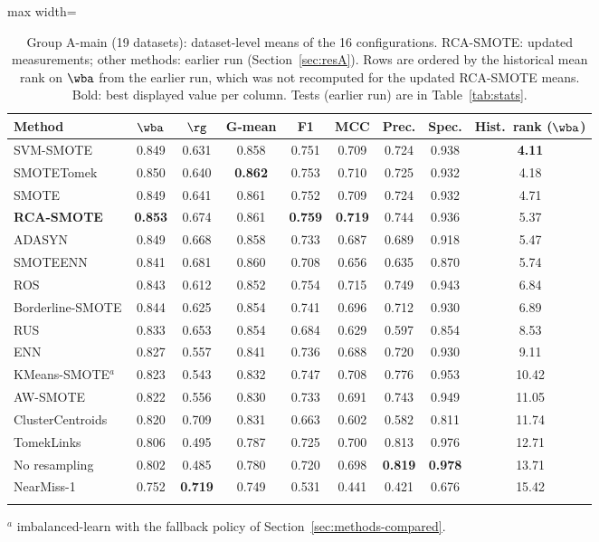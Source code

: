 \begin{table}[!htb]
\caption{Group A-main (19 datasets): dataset-level means of the 16 configurations. RCA-SMOTE: updated measurements; other methods: earlier run (Section~\ref{sec:resA}). Rows are ordered by the historical mean rank on $\wba$ from the earlier run, which was not recomputed for the updated RCA-SMOTE means. Bold: best displayed value per column. Tests (earlier run) are in Table~\ref{tab:stats}.}\label{tab:groupA}
\centering\tabfont
\setlength{\tabcolsep}{4.2pt}
\begin{adjustbox}{max width=\textwidth}
\begin{tabular}{@{}lcccccccc@{}}
\toprule
Method & $\wba$ & $\rg$ & G-mean & F1 & MCC & Prec. & Spec. & Hist.\ rank ($\wba$) \\
\midrule
SVM-SMOTE & 0.849 & 0.631 & 0.858 & 0.751 & 0.709 & 0.724 & 0.938 & \textbf{4.11} \\
SMOTETomek & 0.850 & 0.640 & \textbf{0.862} & 0.753 & 0.710 & 0.725 & 0.932 & 4.18 \\
SMOTE & 0.849 & 0.641 & 0.861 & 0.752 & 0.709 & 0.724 & 0.932 & 4.71 \\
\textbf{RCA-SMOTE} & \textbf{0.853} & 0.674 & 0.861 & \textbf{0.759} & \textbf{0.719} & 0.744 & 0.936 & 5.37 \\
ADASYN & 0.849 & 0.668 & 0.858 & 0.733 & 0.687 & 0.689 & 0.918 & 5.47 \\
SMOTEENN & 0.841 & 0.681 & 0.860 & 0.708 & 0.656 & 0.635 & 0.870 & 5.74 \\
ROS & 0.843 & 0.612 & 0.852 & 0.754 & 0.715 & 0.749 & 0.943 & 6.84 \\
Borderline-SMOTE & 0.844 & 0.625 & 0.854 & 0.741 & 0.696 & 0.712 & 0.930 & 6.89 \\
RUS & 0.833 & 0.653 & 0.854 & 0.684 & 0.629 & 0.597 & 0.854 & 8.53 \\
ENN & 0.827 & 0.557 & 0.841 & 0.736 & 0.688 & 0.720 & 0.930 & 9.11 \\
KMeans-SMOTE$^{a}$ & 0.823 & 0.543 & 0.832 & 0.747 & 0.708 & 0.776 & 0.953 & 10.42 \\
AW-SMOTE & 0.822 & 0.556 & 0.830 & 0.733 & 0.691 & 0.743 & 0.949 & 11.05 \\
ClusterCentroids & 0.820 & 0.709 & 0.831 & 0.663 & 0.602 & 0.582 & 0.811 & 11.74 \\
TomekLinks & 0.806 & 0.495 & 0.787 & 0.725 & 0.700 & 0.813 & 0.976 & 12.71 \\
No resampling & 0.802 & 0.485 & 0.780 & 0.720 & 0.698 & \textbf{0.819} & \textbf{0.978} & 13.71 \\
NearMiss-1 & 0.752 & \textbf{0.719} & 0.749 & 0.531 & 0.441 & 0.421 & 0.676 & 15.42 \\
\botrule
\end{tabular}
\end{adjustbox}
\par\smallskip\raggedright\footnotesize $^{a}$ imbalanced-learn with the fallback policy of Section~\ref{sec:methods-compared}.
\end{table}

